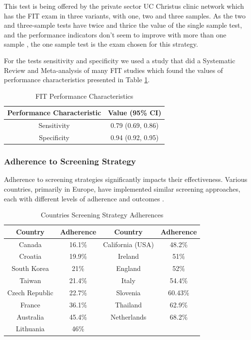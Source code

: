 This test is being offered by the private sector UC Christus clinic network which has the FIT exam in three variants, with one, two and three samples. As the two and three-sample tests have twice and thrice the value of the single sample test, and the performance indicators don’t seem to improve with more than one sample \cite{amitay_fecal_2019}, the one sample test is the exam chosen for this strategy.

For the tests sensitivity and specificity we used a study that did a Systematic Review and Meta-analysis of many FIT studies \cite{lee_accuracy_2014} which found the values of performance characteristics presented in Table \ref{table:fit_performance_characteristics}.

\begin{table}[H]
\caption{FIT Performance Characteristics}
\centering
\begin{tabular}{|c|c|}
\hline
Performance Characteristic & Value (95\% CI)\\ \hline
Sensitivity & 0.79 (0.69, 0.86)\\ \hline
Specificity & 0.94 (0.92, 0.95)\\ \hline
\end{tabular}
\label{table:fit_performance_characteristics}
\end{table}

\subsubsection*{Adherence to Screening Strategy}

Adherence to screening strategies significantly impacts their effectiveness. Various countries, primarily in Europe, have implemented similar screening approaches, each with different levels of adherence and outcomes \cite{navarro_colorectal_2017}.

\begin{table}[H]
\caption{Countries Screening Strategy Adherences}
\centering
\begin{tabular}{|c|c|c|c|}
\hline
Country     & Adherence & Country & Adherence\\ \hline
Canada         & 16.1\% & California (USA)& 48.2\% \\ \hline
Croatia        & 19.9\% & Ireland         & 51\%   \\ \hline
South Korea    & 21\%   & England         & 52\%   \\ \hline
Taiwan         & 21.4\% & Italy           & 54.4\% \\ \hline
Czech Republic & 22.7\% & Slovenia        & 60.43\%\\ \hline
France         & 36.1\% & Thailand        & 62.9\% \\ \hline
Australia      & 45.4\% & Netherlands     & 68.2\% \\ \hline
Lithuania      & 46\%   &  &  \\ \hline
\end{tabular}
\label{table:countries_adherence_percentage}
\end{table}

